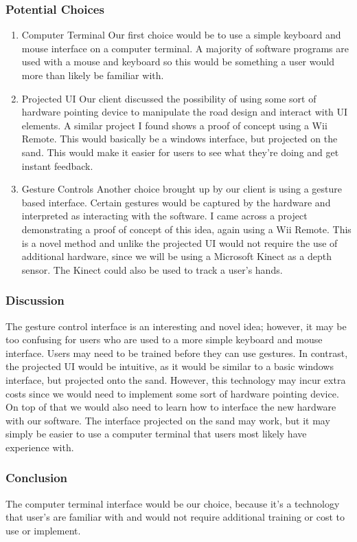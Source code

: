 \subsubsection{Potential Choices}
\begin{enumerate}
\item{Computer Terminal}
Our first choice would be to use a simple keyboard and mouse interface on a computer terminal.
A majority of software programs are used with a mouse and keyboard so this would be something a user would more than likely be familiar with.

\item{Projected UI}
Our client discussed the possibility of using some sort of hardware pointing device to manipulate the road design and interact with UI elements.
A similar project I found shows a proof of concept using a Wii Remote.
This would basically be a windows interface, but projected on the sand.
This would make it easier for users to see what they're doing and get instant feedback.

\item{Gesture Controls}
Another choice brought up by our client is using a gesture based interface.
Certain gestures would be captured by the hardware and interpreted as interacting with the software.
I came across a project demonstrating a proof of concept of this idea, again using a Wii Remote.
This is a novel method and unlike the projected UI would not require the use of additional hardware, since we will be using a Microsoft Kinect as a depth sensor.
The Kinect could also be used to track a user's hands.
\end{enumerate}

\subsubsection{Discussion}
The gesture control interface is an interesting and novel idea; however, it may be too confusing for users who are used to a more simple keyboard and mouse interface.
Users may need to be trained before they can use gestures. In contrast, the projected UI would be intuitive, as it would be similar to a basic windows interface, but projected onto the sand.
However, this technology may incur extra costs since we would need to implement some sort of hardware pointing device.
On top of that we would also need to learn how to interface the new hardware with our software.
The interface projected on the sand may work, but it may simply be easier to use a computer terminal that users most likely have experience with.

\subsubsection{Conclusion}
The computer terminal interface would be our choice, because it's a technology that user's are familiar with and would not require additional training or cost to use or implement.

